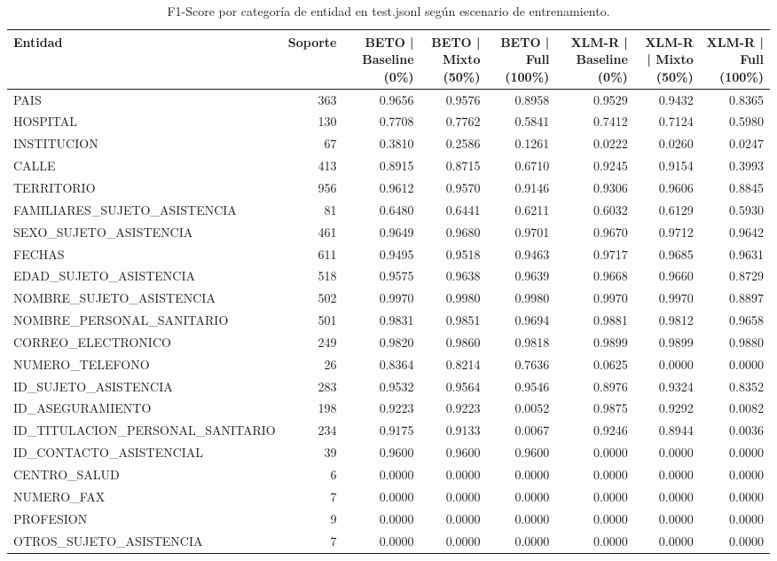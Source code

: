 \begin{table}
\caption{F1-Score por categoría de entidad en test.jsonl según escenario de entrenamiento.}
\label{tab:f1_por_entidad}
\begin{tabular}{lrrrrrrr}
\toprule
Entidad & Soporte & BETO | Baseline (0\%) & BETO | Mixto (50\%) & BETO | Full (100\%) & XLM-R | Baseline (0\%) & XLM-R | Mixto (50\%) & XLM-R | Full (100\%) \\
\midrule
PAIS & 363 & 0.9656 & 0.9576 & 0.8958 & 0.9529 & 0.9432 & 0.8365 \\
HOSPITAL & 130 & 0.7708 & 0.7762 & 0.5841 & 0.7412 & 0.7124 & 0.5980 \\
INSTITUCION & 67 & 0.3810 & 0.2586 & 0.1261 & 0.0222 & 0.0260 & 0.0247 \\
CALLE & 413 & 0.8915 & 0.8715 & 0.6710 & 0.9245 & 0.9154 & 0.3993 \\
TERRITORIO & 956 & 0.9612 & 0.9570 & 0.9146 & 0.9306 & 0.9606 & 0.8845 \\
FAMILIARES\_SUJETO\_ASISTENCIA & 81 & 0.6480 & 0.6441 & 0.6211 & 0.6032 & 0.6129 & 0.5930 \\
SEXO\_SUJETO\_ASISTENCIA & 461 & 0.9649 & 0.9680 & 0.9701 & 0.9670 & 0.9712 & 0.9642 \\
FECHAS & 611 & 0.9495 & 0.9518 & 0.9463 & 0.9717 & 0.9685 & 0.9631 \\
EDAD\_SUJETO\_ASISTENCIA & 518 & 0.9575 & 0.9638 & 0.9639 & 0.9668 & 0.9660 & 0.8729 \\
NOMBRE\_SUJETO\_ASISTENCIA & 502 & 0.9970 & 0.9980 & 0.9980 & 0.9970 & 0.9970 & 0.8897 \\
NOMBRE\_PERSONAL\_SANITARIO & 501 & 0.9831 & 0.9851 & 0.9694 & 0.9881 & 0.9812 & 0.9658 \\
CORREO\_ELECTRONICO & 249 & 0.9820 & 0.9860 & 0.9818 & 0.9899 & 0.9899 & 0.9880 \\
NUMERO\_TELEFONO & 26 & 0.8364 & 0.8214 & 0.7636 & 0.0625 & 0.0000 & 0.0000 \\
ID\_SUJETO\_ASISTENCIA & 283 & 0.9532 & 0.9564 & 0.9546 & 0.8976 & 0.9324 & 0.8352 \\
ID\_ASEGURAMIENTO & 198 & 0.9223 & 0.9223 & 0.0052 & 0.9875 & 0.9292 & 0.0082 \\
ID\_TITULACION\_PERSONAL\_SANITARIO & 234 & 0.9175 & 0.9133 & 0.0067 & 0.9246 & 0.8944 & 0.0036 \\
ID\_CONTACTO\_ASISTENCIAL & 39 & 0.9600 & 0.9600 & 0.9600 & 0.0000 & 0.0000 & 0.0000 \\
CENTRO\_SALUD & 6 & 0.0000 & 0.0000 & 0.0000 & 0.0000 & 0.0000 & 0.0000 \\
NUMERO\_FAX & 7 & 0.0000 & 0.0000 & 0.0000 & 0.0000 & 0.0000 & 0.0000 \\
PROFESION & 9 & 0.0000 & 0.0000 & 0.0000 & 0.0000 & 0.0000 & 0.0000 \\
OTROS\_SUJETO\_ASISTENCIA & 7 & 0.0000 & 0.0000 & 0.0000 & 0.0000 & 0.0000 & 0.0000 \\
\bottomrule
\end{tabular}
\end{table}
